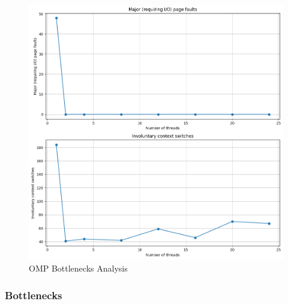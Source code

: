 \documentclass[
]{article}
\begin{document}
\begin{figure}
\includegraphics[width=1\linewidth]{figures/bott_omp.png}
\caption{OMP Bottlenecks Analysis}
\label{}
\end{figure}

\subsubsection{Bottlenecks}\label{bottlenecks}
\end{document}
